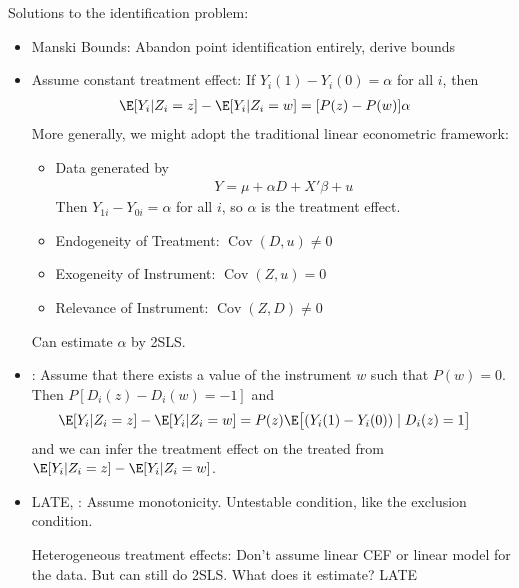 \documentclass[12pt]{article}
\theoremstyle{plain}
\theoremstyle{definition}
\theoremstyle{remark}
\newcommand{\Cov}{\operatorname{Cov}}
\begin{document}
Solutions to the identification problem:
\begin{itemize}
  \item Manski Bounds:
    Abandon point identification entirely, derive bounds
  \item
    Assume constant treatment effect:
    If $Y_i(1)-Y_i(0)=\alpha$ for all $i$, then
    \begin{align*}
      \E[Y_i|Z_i=z]
      -
      \E[Y_i|Z_i=w]
      &=
      [P(z)-P(w)]\alpha
    \end{align*}
    More generally, we might adopt the traditional linear econometric
    framework:
    \begin{itemize}
      \item Data generated by
        \begin{align*}
          Y = \mu + \alpha D + X'\beta + u
        \end{align*}
        Then $Y_{1i}-Y_{0i}=\alpha$ for all $i$, so $\alpha$ is the
        treatment effect.
      \item Endogeneity of Treatment: $\Cov(D,u)\neq 0$
      \item Exogeneity of Instrument: $\Cov(Z,u)= 0$
      \item Relevance of Instrument: $\Cov(Z,D)\neq 0$
    \end{itemize}
    Can estimate $\alpha$ by 2SLS.

  \item \cite{angrist1991sources}:
    Assume that there exists a value of the instrument $w$ such that
    $P(w)=0$.
    Then $P[D_i(z)-D_i(w)=-1]$ and
    \begin{align*}
      \E[Y_i|Z_i=z]
      -
      \E[Y_i|Z_i=w]
      &=
      P(z)
      \E\big[
        (Y_i(1)-Y_i(0))
        \;|\;
        D_i(z)=1
      \big]
    \end{align*}
    and we can infer the treatment effect on the treated from
    $\E[Y_i|Z_i=z] - \E[Y_i|Z_i=w]$.

  \item
    LATE, \cite{imbensangrist1994LATE}:
    Assume monotonicity.
    Untestable condition, like the exclusion condition.

    Heterogeneous treatment effects:
    Don't assume linear CEF or linear model for the data.
    But can still do 2SLS.
    What does it estimate?
    LATE
\end{itemize}
\end{document}
